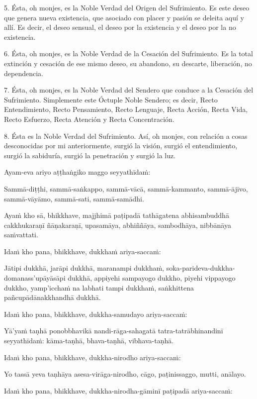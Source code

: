5. Ésta, oh monjes, es la Noble Verdad del Origen del Sufrimiento. Es este deseo que genera nueva existencia, que asociado con placer y pasión se deleita aquí y allí. Es decir, el deseo sensual, el deseo por la existencia y el deseo por la no existencia.

6. Ésta, oh monjes, es la Noble Verdad de la Cesación del Sufrimiento. Es la total extinción y cesación de ese mismo deseo, su abandono, su descarte, liberación, no dependencia.

7. Ésta, oh monjes, es la Noble Verdad del Sendero que conduce a la Cesación del Sufrimiento. Simplemente este Óctuple Noble Sendero; es decir, Recto Entendimiento, Recto Pensamiento, Recto Lenguaje, Recta Acción, Recta Vida, Recto Esfuerzo, Recta Atención y Recta Concentración.

8. Ésta es la Noble Verdad del Sufrimiento. Así, oh monjes, con relación a cosas desconocidas por mi anteriormente, surgió la visión, surgió el entendimiento, surgió la sabiduría, surgió la penetración y surgió la luz.

\clearpage

\paliText
\markboth{\paliTitle}{\rightmark}

Ayam-eva ariyo aṭṭhaṅgiko maggo seyyathīdaṁ:

Sammā-diṭṭhi, sammā-saṅkappo, sammā-vācā, sammā-kammanto, sammā-ājīvo,
sammā-vāyāmo, sammā-sati, sammā-samādhi.

Ayaṁ kho sā, bhikkhave, majjhimā paṭipadā tathāgatena abhisambuddhā
cakkhukaraṇī ñāṇakaraṇī, upasamāya, abhiññāya, sambodhāya, nibbānāya
saṁvattati.

Idaṁ kho pana, bhikkhave, dukkhaṁ ariya-saccaṁ:

Jātipi dukkhā, jarāpi dukkhā, maranampi dukkhaṁ,
soka-parideva-dukkha-domanass'upāyāsāpi dukkhā, appiyehi sampayogo
dukkho, piyehi vippayogo dukkho, yamp'icchaṁ na labhati tampi dukkhaṁ,
saṅkhittena pañcupādānakkhandhā dukkhā.

Idaṁ kho pana, bhikkhave, dukkha-samudayo ariya-saccaṁ:

Yā'yaṁ taṇhā ponobbhavikā nandi-rāga-sahagatā tatra-tatrābhinandinī
seyyathīdaṁ: kāma-taṇhā, bhava-taṇhā, vibhava-taṇhā.

Idaṁ kho pana, bhikkhave, dukkha-nirodho ariya-saccaṁ:

Yo tassā yeva taṇhāya asesa-virāga-nirodho, cāgo, paṭinissaggo, mutti,
anālayo.

Idaṁ kho pana, bhikkhave, dukkha-nirodha-gāminī paṭipadā ariya-saccaṁ:

